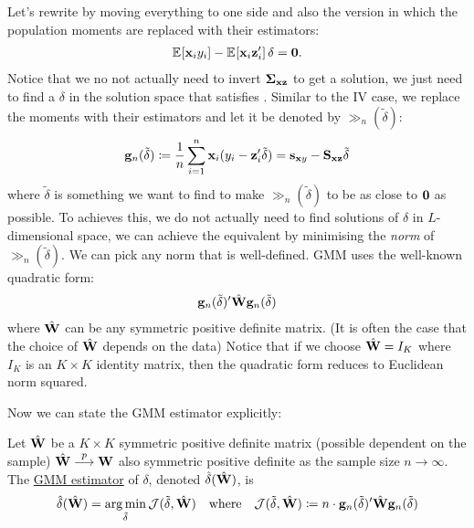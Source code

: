 \documentclass{article}
\begin{document}
Let's rewrite  by moving everything to one side and also the version in which
the population moments are replaced with their estimators:
\begin{align}\label{essence_one}
	\operatorname{\mathbb{E}}_{}\!\left[\mathbf{x}_i y_i\right] - \operatorname{\mathbb{E}}_{}\!\left[\mathbf{x}_i \mathbf{z}_i'\right]\delta = \mathbf{0}.
\end{align}
Notice that we no not actually need to invert $\boldsymbol{\Sigma}_{\mathbf{x}\mathbf{z}}$ to get a solution,
we just need to find a $\delta$ in the solution space that satisfies .
Similar to the IV case, we replace the moments with their estimators
and let it be denoted by $\gg_n(\tilde{\delta})$:
\begin{align}\label{essence_two}
	\mathbf{g}_n(\tilde{\delta})
	\coloneqq \frac1n \sum_{i=1}^{n} \mathbf{x}_i(y_i - \mathbf{z}_i'\tilde{\delta})
	= \mathbf{s}_{\mathbf{x} y} - \mathbf{S}_{\mathbf{x}\mathbf{z}}\tilde{\delta}
\end{align}
where $\tilde{\delta}$ is something we want to find to make $\gg_n(\tilde{\delta})$ to be as close
to $\mathbf{0}$ as possible.
To achieves this, we do not actually need to find solutions of $\delta$ in $L$-dimensional space,
we can achieve the equivalent by minimising the \emph{norm} of $\gg_n(\tilde{\delta})$.
We can pick any norm that is well-defined.
GMM uses the well-known quadratic form:
\begin{align*}
	\mathbf{g}_n(\tilde{\delta})'\hat{\mathbf{W}}\mathbf{g}_n(\tilde{\delta})
\end{align*}
where $\hat{\mathbf{W}}$ can be any symmetric positive definite matrix.
(It is often the case that the choice of $\hat{\mathbf{W}}$ depends on the data)
Notice that if we choose $\hat{\mathbf{W}}=I_K$ where $I_K$ is an $K\times K$ identity matrix,
then the quadratic form reduces to Euclidean norm squared.

Now we can state the GMM estimator explicitly:
\begin{definition}
	Let $\hat{\mathbf{W}}$ be a $K\times K$ symmetric positive definite matrix
	(possible dependent on the sample)
	\suchthat $\hat{\mathbf{W}}\overset{p}{\longrightarrow}\mathbf{W}$ also symmetric positive definite as the sample size $n\to\infty$.
	The \underline{GMM estimator} of $\delta$, denoted $\hat{\delta}(\hat{\mathbf{W}})$, is
	\begin{align*}
		\hat{\delta}(\hat{\mathbf{W}})
		= \operatorname*{\arg\min}_{\tilde{\delta}} \mathcal{J}(\tilde{\delta},\hat{\mathbf{W}})
		\quad\text{where}\quad
		\mathcal{J}(\tilde{\delta},\hat{\mathbf{W}})
		\coloneqq n\cdot\mathbf{g}_n(\tilde{\delta})'\hat{\mathbf{W}}\mathbf{g}_n(\tilde{\delta})
	\end{align*}
\end{definition}
\end{document}
